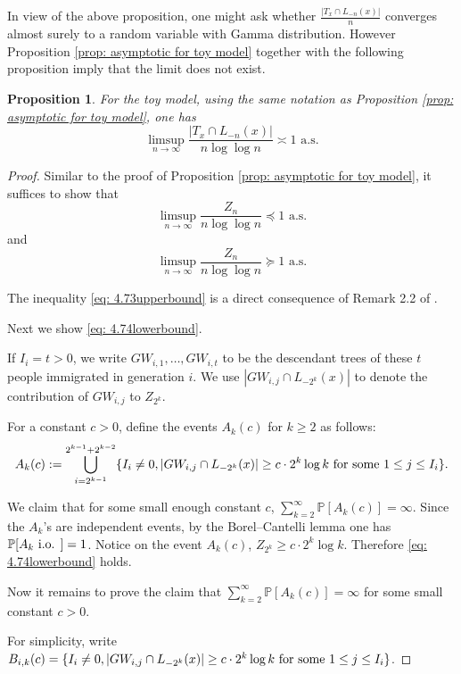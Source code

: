\documentclass[12pt]{article}
\newtheorem{proposition}[theorem]{Proposition}
\numberwithin{equation}{section}
\newcommand{\be}{\begin{equation}}
\newcommand{\ee}{\end{equation}}
\def\as {\mathrm{a.s.}}
\newcommand{\1}{\mathbf{1}}
\begin{document}
 In view of the above proposition, one might ask whether 
 $\frac{|T_x\cap L_{-n}(x)|}{n} $ converges almost surely to a  random variable with Gamma distribution. However Proposition \ref{prop: asymptotic for toy model} together with the following proposition imply that the limit does not exist. 
 
 \begin{proposition}\label{prop: aymptotic for limsup of toy model}
 	For the toy model, using the same notation as Proposition \ref{prop: asymptotic for toy model}, one has 
 	\[
 	\limsup_{n\rightarrow\infty}\frac{|T_x\cap L_{-n}(x)|}{n\log \log n}\asymp 1\, \, \as
 	\]
 	
 \end{proposition} 
 \begin{proof}
 	Similar to the proof of Proposition \ref{prop: asymptotic for toy model}, it suffices to show that 
 	\be\label{eq: 4.73upperbound}
 	\limsup_{n\rightarrow\infty}\frac{Z_n}{n\log \log n}\preceq 1\, \, \as
 	\ee
 	and
 	\be\label{eq: 4.74lowerbound}
 	\limsup_{n\rightarrow\infty}\frac{Z_n}{n\log \log n}\succeq 1\, \, \as
 	\ee
 	
 	The inequality \eqref{eq: 4.73upperbound} is a direct consequence of Remark 2.2 of \cite{Wei1991}.
 	
 	Next we show \eqref{eq: 4.74lowerbound}. 
 	
 	If $I_i=t>0$, we write $GW_{i,1},\ldots,GW_{i,t}$ to be the descendant trees of these $t$ people immigrated in generation $i$. We use  $|GW_{i,j}\cap L_{-2^k}(x)|$ to denote the contribution  of $GW_{i,j}$ to $Z_{2^k}$.
 	
 	For a constant $c>0$, define the events $A_k(c)$ for $k\geq 2$ as follows:
 	\[
 	A_k(c):= \bigcup_{i=2^{k-1}}^{2^{k-1}+2^{k-2} } \{I_i\neq 0, |GW_{i,j}\cap L_{-2^k}(x)|\geq c\cdot2^k\log k \textnormal{ for some } 1\leq j\leq I_i \}.
 	\]
 	
 	
 	We claim that for some small enough constant $c$, $\sum_{k=2}^{\infty}\mathbb{P}[A_k(c)]=\infty$. Since the $A_k$'s are independent events, by the Borel--Cantelli lemma one has $\mathbb{P}[ A_k \textnormal{ i.o. }]=1$. 	Notice on the event $A_k(c)$,  $Z_{2^k}\geq c\cdot2^k\log k$. Therefore \eqref{eq: 4.74lowerbound} holds.
 	
 	Now it remains to prove the claim that $\sum_{k=2}^{\infty}\mathbb{P}[A_k(c)]=\infty$ for some small constant $c>0$. 
 	
 	For simplicity, write $B_{i,k}(c)=\{I_i\neq 0, |GW_{i,j}\cap L_{-2^k}(x)|\geq c\cdot2^k\log k \textnormal{ for some } 1\leq j\leq I_i \}$. 
 	

\end{proof}
\end{document}

